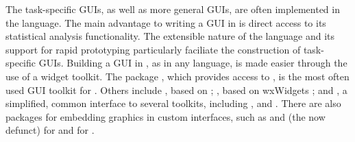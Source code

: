\documentclass[article,shortnames]{jss}
\begin{document}
The task-specific GUIs, as well as more general  GUIs,
are often implemented in the  language. The main advantage
to 
writing a GUI in  is direct access to its statistical
analysis
functionality. The extensible nature of the  language and
its support 
for rapid prototyping particularly faciliate the construction of
task-specific GUIs.
Building a GUI in , as in any language, is made easier
through the use of a 
widget toolkit. The  package \citep{Rnews:Dalgaard:2001a,
Rnews:Dalgaard:2002},
which provides access to  \citep{ousterhout,welch}, is the
most often 
used GUI toolkit for . Others include 
\citep{RGtk}, based
on  \citep{GTK};  \citep{RwxWidgets}, based
on
wxWidgets \citep{wxwidgets}; and  \citep{gWidgets}, a
simplified, common interface to several toolkits, including
, 
and  . There are also packages for embedding
graphics in custom interfaces, such as  \citep{cairoDevice} and (the now defunct) 
\citep{gtkDevice} for  and  
\citep{tkrplot} for .
\end{document}
